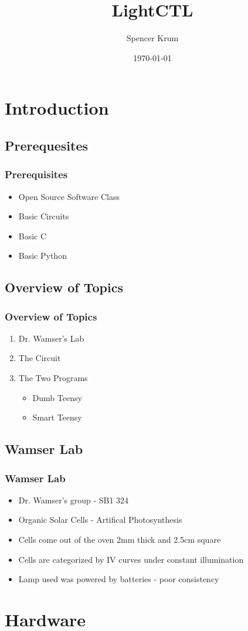 \documentclass{beamer}
\title{LightCTL}
\date{\today}
\author{Spencer Krum}
\begin{document}
\frame{\titlepage}

\section{Introduction}
\subsection{Prerequesites}
\frame
{
	\frametitle{Prerequisites}
	\begin{itemize}
		\item Open Source Software Class
		\item Basic Circuits
		\item Basic C
		\item Basic Python
	\end{itemize}
}

\subsection{Overview of Topics}
\frame
{
	\frametitle{Overview of Topics}
	\begin{enumerate}
		\item Dr. Wamser's Lab
		\item The Circuit
		\item The Two Programs
		\begin{itemize}
			\item Dumb Teensy
			\item Smart Teensy
		\end{itemize}
	\end{enumerate}
}

\subsection{Wamser Lab}
\frame
{
	\frametitle{Wamser Lab}
	\begin{itemize}
		\item Dr. Wamser's group - SB1 324
		\item Organic Solar Cells - Artifical Photosynthesis
		\item Cells come out of the oven 2mm thick and 2.5cm square
		\item Cells are categorized by IV curves under constant illumination
		\item Lamp used was powered by batteries - poor consistency
	\end{itemize}
}

\section{Hardware}
\end{document}
